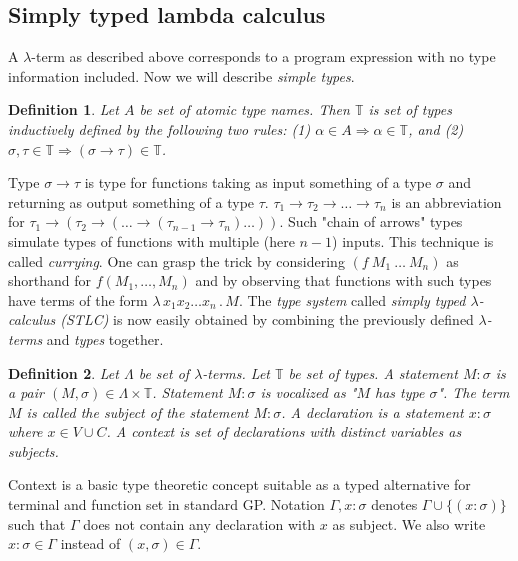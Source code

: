 \documentclass[11pt]{article}
\newtheorem{definition}{Definition}
\newcommand{\lterm}{$\lambda$-term\xspace}
\newcommand{\lterms}{$\lambda$-terms\xspace}
\newcommand{\then}{\Rightarrow\xspace}
\newcommand{\lam}[2]{\lambda \, #1 \, . \, #2}
\newcommand{\ar}{\rightarrow\xspace}
\newcommand{\T}{\mathbb{T}\xspace}
\begin{document}
\begin{article}
\subsection{Simply typed lambda calculus}

A \lterm as described above corresponds to a program expression with no type information included. Now we will describe \textit{simple types}. 

\begin{definition}
Let $A$ be set of {\it atomic type names}. 
Then $\mathbb{T}$ is set of {\it types} inductively defined by the following two rules:
(1) $\alpha      \in A  \then   \alpha \in \T$, and
(2) $\sigma,\tau \in \T \then ( \sigma \ar  \tau ) \in \T$.
\end{definition}

Type $\sigma \ar \tau$ is type for functions taking as input
something of a type $\sigma$ and returning 
as output something of a type $\tau$. 
$\tau_1 \ar \tau_2 \ar \dots \ar \tau_n$ is an abbreviation for 
$\tau_1 \ar (\tau_2 \ar (\dots \ar (\tau_{n-1} \ar \tau_n)\dots))$. Such "chain of arrows" types simulate types of functions with multiple (here $n-1$) inputs. 
This technique is called \textit{currying}. One can grasp the trick by considering $(f~M_1~\dots~M_n)$ as shorthand for $f(M_1,\dots,M_n)$
and by observing that functions with such types have terms of the form $\lam{x_1 x_2 \dots x_n }{M}$. 
The \textit{type system} called \textit{simply typed $\lambda$-calculus (STLC)} is now easily obtained by combining the previously defined \textit{\lterms} and \textit{types} together. 

\begin{definition} Let $\Lambda$ be set of {\it \lterms}. 
	Let $\mathbb{T}$ be set of {\it types}.       
	A {\it statement} $M : \sigma$ is a pair 
	$(M,\sigma) \in \Lambda \times \mathbb{T}$.
	Statement $M : \sigma$ is vocalized as 
	{\it "$M$ has type $\sigma$"}.
	The term $M$ is called the {\it subject} of the 
	statement $M : \sigma$.
A \textit{declaration} is a statement 
 $x : \sigma$ where $x \in V \cup C$.
A \textit{context} 
 is set of declarations with distinct variables as subjects.
\end{definition}



Context is a basic type theoretic concept suitable as a typed alternative
for terminal and function set in standard GP. 
Notation $\Gamma,x:\sigma $ denotes $ \Gamma\cup\{(x:\sigma)\}$ 
such that $\Gamma$ does not contain any declaration with $x$ as subject.
We also write $x:\sigma \in \Gamma$ instead of $(x,\sigma) \in \Gamma$.



\end{article}
\end{document}
